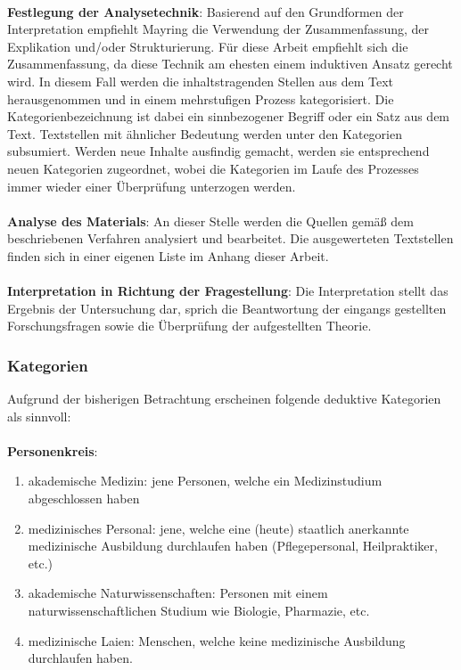 \documentclass[
    a4paper,
    12pt,
    hyphens,
    chapterprefix=true,
    headheight=33pt,
    footheight=29pt,
    headings=optiontohead, %
]{scrartcl}
\begin{document}
\\
\textbf{Festlegung der Analysetechnik}: Basierend auf den Grundformen der Interpretation empfiehlt Mayring die Verwendung der Zusammenfassung, der Explikation und/oder Strukturierung. Für diese Arbeit empfiehlt sich die Zusammenfassung, da diese Technik am ehesten einem induktiven Ansatz gerecht wird. In diesem Fall werden die inhaltstragenden Stellen aus dem Text herausgenommen und in einem mehrstufigen Prozess kategorisiert. Die Kategorienbezeichnung ist dabei ein sinnbezogener Begriff oder ein Satz aus dem Text. Textstellen mit ähnlicher Bedeutung werden unter den Kategorien subsumiert. Werden neue Inhalte ausfindig gemacht, werden sie entsprechend neuen Kategorien zugeordnet, wobei die Kategorien im Laufe des Prozesses immer wieder einer Überprüfung unterzogen werden.\\
\\
\textbf{Analyse des Materials}: An dieser Stelle werden die Quellen gemäß dem beschriebenen Verfahren analysiert und bearbeitet. Die ausgewerteten Textstellen finden sich in einer eigenen Liste im Anhang dieser Arbeit.\\
\\
\textbf{Interpretation in Richtung der Fragestellung}: Die Interpretation stellt das Ergebnis der Untersuchung dar, sprich die Beantwortung der eingangs gestellten Forschungsfragen sowie die Überprüfung der aufgestellten Theorie.

\subsubsection{Kategorien}
Aufgrund der bisherigen Betrachtung erscheinen folgende deduktive Kategorien als sinnvoll:\\
\\
\textbf{Personenkreis}:
\begin{enumerate}
    \item{akademische Medizin: jene Personen, welche ein Medizinstudium abgeschlossen haben}
  \item{medizinisches Personal: jene, welche eine (heute) staatlich anerkannte medizinische Ausbildung durchlaufen haben (Pflegepersonal, Heilpraktiker, etc.)}
  \item{akademische Naturwissenschaften: Personen mit einem naturwissenschaftlichen Studium wie Biologie, Pharmazie, etc.}
  \item{medizinische Laien: Menschen, welche keine medizinische Ausbildung durchlaufen haben.}
\end{enumerate}
\end{document}
